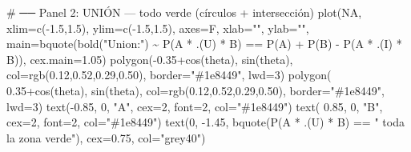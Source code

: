 \documentclass[
  letterpaper,
  DIV=11,
  numbers=noendperiod]{scrartcl}
\newenvironment{Shaded}{\begin{snugshade}}{\end{snugshade}}
\newcommand{\AttributeTok}[1]{\textcolor[rgb]{0.40,0.45,0.13}{#1}}
\newcommand{\CommentTok}[1]{\textcolor[rgb]{0.37,0.37,0.37}{#1}}
\newcommand{\ConstantTok}[1]{\textcolor[rgb]{0.56,0.35,0.01}{#1}}
\newcommand{\DecValTok}[1]{\textcolor[rgb]{0.68,0.00,0.00}{#1}}
\newcommand{\FloatTok}[1]{\textcolor[rgb]{0.68,0.00,0.00}{#1}}
\newcommand{\FunctionTok}[1]{\textcolor[rgb]{0.28,0.35,0.67}{#1}}
\newcommand{\NormalTok}[1]{\textcolor[rgb]{0.00,0.23,0.31}{#1}}
\newcommand{\SpecialCharTok}[1]{\textcolor[rgb]{0.37,0.37,0.37}{#1}}
\newcommand{\StringTok}[1]{\textcolor[rgb]{0.13,0.47,0.30}{#1}}
\begin{document}
\begin{Shaded}
\begin{Highlighting}[]
\CommentTok{\# ── Panel 2: UNIÓN — todo verde (círculos + intersección)}
\FunctionTok{plot}\NormalTok{(}\ConstantTok{NA}\NormalTok{, }\AttributeTok{xlim=}\FunctionTok{c}\NormalTok{(}\SpecialCharTok{{-}}\FloatTok{1.5}\NormalTok{,}\FloatTok{1.5}\NormalTok{), }\AttributeTok{ylim=}\FunctionTok{c}\NormalTok{(}\SpecialCharTok{{-}}\FloatTok{1.5}\NormalTok{,}\FloatTok{1.5}\NormalTok{), }\AttributeTok{axes=}\NormalTok{F, }\AttributeTok{xlab=}\StringTok{""}\NormalTok{, }\AttributeTok{ylab=}\StringTok{""}\NormalTok{,}
     \AttributeTok{main=}\FunctionTok{bquote}\NormalTok{(}\FunctionTok{bold}\NormalTok{(}\StringTok{"Union:"}\NormalTok{) }\SpecialCharTok{\textasciitilde{}} \FunctionTok{P}\NormalTok{(A }\SpecialCharTok{*}\NormalTok{ .(U) }\SpecialCharTok{*}\NormalTok{ B) }\SpecialCharTok{==} \FunctionTok{P}\NormalTok{(A) }\SpecialCharTok{+} \FunctionTok{P}\NormalTok{(B) }\SpecialCharTok{{-}} \FunctionTok{P}\NormalTok{(A }\SpecialCharTok{*}\NormalTok{ .(I) }\SpecialCharTok{*}\NormalTok{ B)),}
     \AttributeTok{cex.main=}\FloatTok{1.05}\NormalTok{)}
\FunctionTok{polygon}\NormalTok{(}\SpecialCharTok{{-}}\FloatTok{0.35}\SpecialCharTok{+}\FunctionTok{cos}\NormalTok{(theta), }\FunctionTok{sin}\NormalTok{(theta), }\AttributeTok{col=}\FunctionTok{rgb}\NormalTok{(}\FloatTok{0.12}\NormalTok{,}\FloatTok{0.52}\NormalTok{,}\FloatTok{0.29}\NormalTok{,}\FloatTok{0.50}\NormalTok{), }\AttributeTok{border=}\StringTok{"\#1e8449"}\NormalTok{, }\AttributeTok{lwd=}\DecValTok{3}\NormalTok{)}
\FunctionTok{polygon}\NormalTok{( }\FloatTok{0.35}\SpecialCharTok{+}\FunctionTok{cos}\NormalTok{(theta), }\FunctionTok{sin}\NormalTok{(theta), }\AttributeTok{col=}\FunctionTok{rgb}\NormalTok{(}\FloatTok{0.12}\NormalTok{,}\FloatTok{0.52}\NormalTok{,}\FloatTok{0.29}\NormalTok{,}\FloatTok{0.50}\NormalTok{), }\AttributeTok{border=}\StringTok{"\#1e8449"}\NormalTok{, }\AttributeTok{lwd=}\DecValTok{3}\NormalTok{)}
\FunctionTok{text}\NormalTok{(}\SpecialCharTok{{-}}\FloatTok{0.85}\NormalTok{, }\DecValTok{0}\NormalTok{, }\StringTok{"A"}\NormalTok{, }\AttributeTok{cex=}\DecValTok{2}\NormalTok{, }\AttributeTok{font=}\DecValTok{2}\NormalTok{, }\AttributeTok{col=}\StringTok{"\#1e8449"}\NormalTok{)}
\FunctionTok{text}\NormalTok{( }\FloatTok{0.85}\NormalTok{, }\DecValTok{0}\NormalTok{, }\StringTok{"B"}\NormalTok{, }\AttributeTok{cex=}\DecValTok{2}\NormalTok{, }\AttributeTok{font=}\DecValTok{2}\NormalTok{, }\AttributeTok{col=}\StringTok{"\#1e8449"}\NormalTok{)}
\FunctionTok{text}\NormalTok{(}\DecValTok{0}\NormalTok{, }\SpecialCharTok{{-}}\FloatTok{1.45}\NormalTok{, }\FunctionTok{bquote}\NormalTok{(}\FunctionTok{P}\NormalTok{(A }\SpecialCharTok{*}\NormalTok{ .(U) }\SpecialCharTok{*}\NormalTok{ B) }\SpecialCharTok{==} \StringTok{" toda la zona verde"}\NormalTok{), }\AttributeTok{cex=}\FloatTok{0.75}\NormalTok{, }\AttributeTok{col=}\StringTok{"grey40"}\NormalTok{)}


\end{Highlighting}
\end{Shaded}
\end{document}

